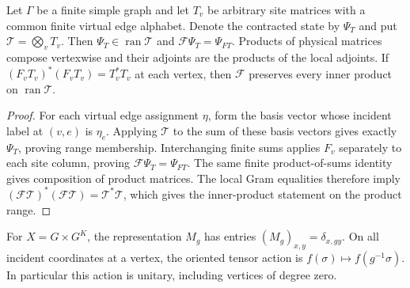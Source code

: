 \begin{lemma}%
    \label{thm:peps_graph_physical_support_transport}
    \leanok
    Let $\Gamma$ be a finite simple graph and let $T_v$ be arbitrary site
    matrices with a common finite virtual edge alphabet. Denote the
    contracted state by $\Psi_T$ and put $\mathcal T=\bigotimes_vT_v$.
    Then $\Psi_T\in\operatorname{ran}\mathcal T$ and
    $\mathcal F\Psi_T=\Psi_{FT}$. Products of physical matrices compose
    vertexwise and their adjoints are the products of the local adjoints.
    If $(F_vT_v)^*(F_vT_v)=T_v^*T_v$ at each vertex, then $\mathcal F$
    preserves every inner product on $\operatorname{ran}\mathcal T$.
\end{lemma}

\begin{proof}\leanok
    For each virtual edge assignment $\eta$, form the basis vector whose
    incident label at $(v,e)$ is $\eta_e$. Applying $\mathcal T$ to the sum
    of these basis vectors gives exactly $\Psi_T$, proving range membership.
    Interchanging finite sums applies $F_v$ separately to each site column,
    proving $\mathcal F\Psi_T=\Psi_{FT}$. The same finite product-of-sums
    identity gives composition of product matrices. The local Gram
    equalities therefore imply
    $(\mathcal F\mathcal T)^*(\mathcal F\mathcal T)=\mathcal T^*\mathcal T$,
    which gives the inner-product statement on the product range.
\end{proof}

\begin{lemma}%
    \label{thm:peps_regular_bundle_incident_action}
    \leanok
    For $X=G\times G^K$, the representation $M_g$ has entries
    $(M_g)_{x,y}=\delta_{x,gy}$. On all incident coordinates at a vertex,
    the oriented tensor action is $f(\sigma)\mapsto f(g^{-1}\sigma)$.
    In particular this action is unitary, including vertices of degree zero.
\end{lemma}

